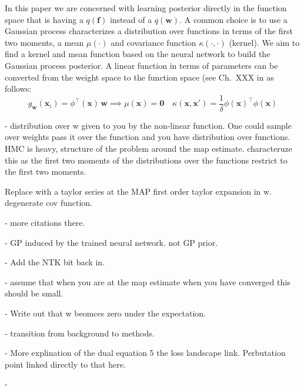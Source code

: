 \documentclass{article}
\newcommand{\weights}{\ensuremath{\mathbf{w}}}
\newcommand{\mbf}[1]{\mathbf{#1}}
\newcommand{\vzeros}{\mbf{0}}
\newcommand{\vf}{\mbf{f}}
\newcommand{\vx}{\mbf{x}}
\newcommand{\vw}{\mbf{w}}
\newcommand{\Jac}[2]{\mathcal{J}_{#1}(#2)}
\begin{document}
In this paper we are concerned with learning posterior directly in the function space that is having a $q(\vf)$ instead of a $q(\vw)$. A common choice is to use a Gaussian process characterizes a distribution over functions in terms of the first two moments, a mean $\mu(\cdot)$ and covariance function $\kappa(\cdot,\cdot)$ (kernel). We aim to find a kernel and mean function based on the neural network to build the Gaussian process posterior.  A linear function in terms of parameters can be converted from the weight space to the function space (see Ch.~XXX in \cite{rasmussen2006gaussian} as follows:
\begin{equation} \label{eq:weight_func}
g_\weights(\mathbf{x}_{i}) = \phi^\top\!(\vx) \, \vw \implies \mu(\vx) = \vzeros \quad \kappa(\mathbf{x}, \mathbf{x}') = \frac{1}{\delta} \phi(\vx)^\top \phi(\vx)
\end{equation}






- distribution over w given to you by the non-linear function. One could sample over weights pass it over the function and you have distribution over functions. HMC is heavy, structure of the problem around the map estimate. characteruze this as the first two moments of the distributions over the functions restrict to the first two moments.  

Replace with a taylor series at the MAP first order taylor expansion in w. degenerate cov function.

- more citations there.

- GP induced by the trained neural network. not GP prior.

- Add the NTK bit back in.

- assume that when you are at the map estimate when you have converged this should be small. 

- Write out that w beomces zero under the expectation.

-  transition from background to methods. 

- More explination of the dual equation 5 the loss landscape link. Perbutation point linked directly to that here. 

- 



%
%
%
\end{document}
